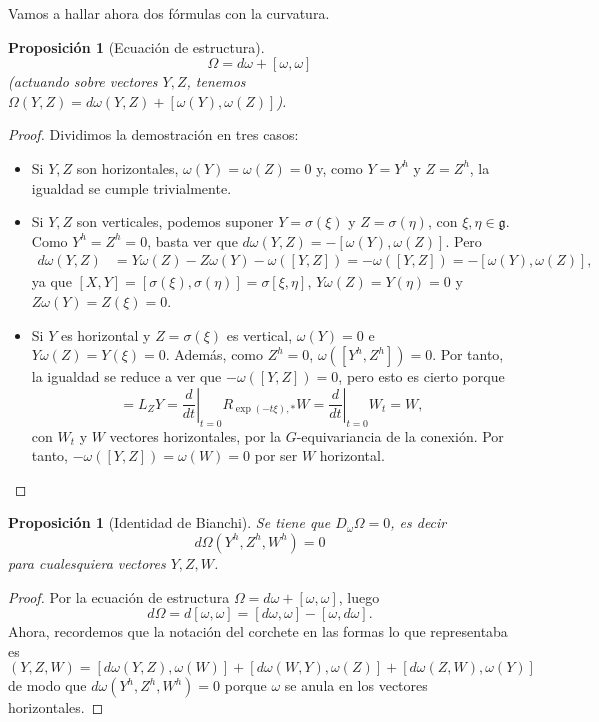 \documentclass[12pt,a4paper]{article}
\newtheorem{prop}[thm]{Proposición}
\theoremstyle{definition} \newtheorem{defn}[thm]{Definición}
\theoremstyle{definition} \newtheorem{ejemplo}[thm]{Ejemplo}
\theoremstyle{definition} \newtheorem{ejercicio}[thm]{Ejercicio}
\theoremstyle{remark} \newtheorem*{obs}{Observación}
\def\gg{\mathfrak{g}}
\begin{document}
	Vamos a hallar ahora dos fórmulas con la curvatura.
	\begin{prop}[Ecuación de estructura]
	  \begin{equation*}
	    \Omega=d\omega + [\omega,\omega]
	  \end{equation*}
	  (actuando sobre vectores $Y,Z$, tenemos $\Omega(Y,Z)=d\omega(Y,Z)+[\omega(Y),\omega(Z)]$).
	\end{prop}
	\begin{proof}
	  Dividimos la demostración en tres casos:
	  \begin{itemize}
	    \item Si $Y,Z$ son horizontales, $\omega(Y)=\omega(Z)=0$ y, como $Y=Y^h$ y $Z=Z^h$, la igualdad se cumple trivialmente.
	    \item Si $Y,Z$ son verticales, podemos suponer $Y=\sigma(\xi)$ y $Z=\sigma(\eta)$, con $\xi, \eta \in \gg$. Como $Y^h=Z^h=0$, basta ver que $d\omega(Y,Z)=-[\omega(Y),\omega(Z)]$. Pero
	      \begin{align*}
		d\omega(Y,Z)& =Y\omega(Z)-Z \omega(Y)-\omega([Y,Z])=-\omega([Y,Z])=-[\omega(Y),\omega(Z)],
	      \end{align*}
	      ya que $[X,Y]=[\sigma(\xi),\sigma(\eta)]=\sigma[\xi,\eta]$, $Y \omega(Z)=Y(\eta)=0$ y $Z \omega(Y)=Z(\xi)=0$.
	    \item Si $Y$ es horizontal y $Z=\sigma(\xi)$ es vertical, $\omega(Y)=0$ e $Y\omega(Z)=Y(\xi)=0$. Además, como $Z^h=0$, $\omega([Y^h,Z^h])=0$. Por tanto, la igualdad se reduce a ver que $-\omega([Y,Z])=0$, pero esto es cierto porque 
	      \begin{equation*}
		[Z,Y]=L_Z Y=\left.\frac{d}{dt}\right|_{t=0} R_{\exp(-t\xi),*}W=\left.\frac{d}{dt}\right|_{t=0} W_t=W,
	      \end{equation*}
	      con $W_t$ y $W$ vectores horizontales, por la $G$-equivariancia de la conexión. Por tanto, $-\omega([Y,Z])=\omega(W)=0$ por ser $W$ horizontal.
	  \end{itemize}

	\end{proof}

	\begin{prop}[Identidad de Bianchi]
	  Se tiene que $D_\omega \Omega=0$, es decir
	  \begin{equation*}
	    d\Omega(Y^h,Z^h,W^h)=0
	  \end{equation*}
	  para cualesquiera vectores $Y,Z,W$.
	\end{prop}
	\begin{proof}
	  Por la ecuación de estructura $\Omega=d\omega + [\omega,\omega]$, luego
	  \begin{equation*}
	    d\Omega=d[\omega,\omega]=[d\omega,\omega]-[\omega,d\omega].
	  \end{equation*}
	  Ahora, recordemos que la notación del corchete en las formas lo que representaba es
	  \begin{equation*}
	    [d\omega,\omega](Y,Z,W)=[d\omega(Y,Z),\omega(W)]+[d\omega(W,Y), \omega(Z)]+[d\omega(Z,W),\omega(Y)]
	  \end{equation*}
	  de modo que $d\omega(Y^h,Z^h,W^h)=0$ porque $\omega$ se anula en los vectores horizontales.
	\end{proof}
\end{document}
